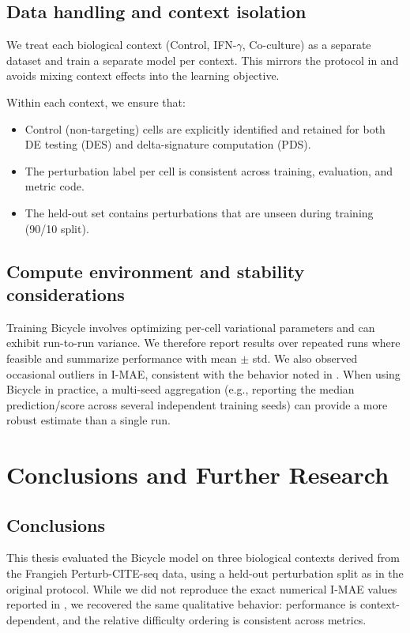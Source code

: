 \documentclass[12pt]{article}
\begin{document}
\subsection{Data handling and context isolation}
We treat each biological context (Control, IFN-\(\gamma\), Co-culture) as a separate dataset and train
a separate model per context. This mirrors the protocol in \cite{rohbeck2024bicycle} and avoids
mixing context effects into the learning objective.

Within each context, we ensure that:
\begin{itemize}
    \item Control (non-targeting) cells are explicitly identified and retained for both DE testing
    (DES) and delta-signature computation (PDS).
    \item The perturbation label per cell is consistent across training, evaluation, and metric code.
    \item The held-out set contains perturbations that are unseen during training (90/10 split).
\end{itemize}

\subsection{Compute environment and stability considerations}
Training Bicycle involves optimizing per-cell variational parameters and can exhibit run-to-run
variance. We therefore report results over repeated runs where feasible and summarize performance
with mean \(\pm\) std. We also observed occasional outliers in I-MAE, consistent with the behavior
noted in \cite{rohbeck2024bicycle}. When using Bicycle in practice, a multi-seed aggregation (e.g., reporting the median prediction/score across several independent training seeds) can provide a more robust estimate than a single run.

\section{Conclusions and Further Research}\label{conclusions}
\subsection{Conclusions}
This thesis evaluated the Bicycle model on three biological contexts derived from
the Frangieh Perturb-CITE-seq data, using a held-out perturbation split as in the original protocol.
While we did not reproduce the exact numerical I-MAE values reported in \cite{rohbeck2024bicycle},
we recovered the same qualitative behavior: performance is context-dependent, and the relative
difficulty ordering is consistent across metrics.
\end{document}
